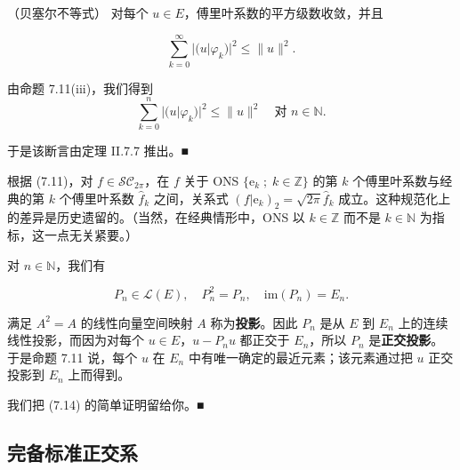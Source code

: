 \begin{corollary}

（贝塞尔不等式）  对每个 $ u \in E $，傅里叶系数的平方级数收敛，并且

\[
\sum_{k=0}^{\infty}|(u|\varphi_{k})|^{2} \le \|u\|^{2} .
\]

\proofhead
由命题 7.11(iii)，我们得到
\[
\sum_{k=0}^{n}|(u|\varphi_{k})|^{2} \le \|u\|^{2} \quad \text{对 } n \in \mathbb{N} .
\]

于是该断言由定理 II.7.7 推出。\nobreak\hspace{0.35em}■

\end{corollary}

\begin{remark}

\begin{items}
\item

根据 (7.11)，对 $ f \in \mathcal{SC}_{2\pi} $，在 $ f $ 关于 ONS $ \{ \mathrm{e}_{k} \;;\; k \in \mathbb{Z} \} $ 的第 $ k $ 个傅里叶系数与经典的第 $ k $ 个傅里叶系数 $ \hat{f}_{k} $ 之间，关系式 $ (f|\mathrm{e}_{k})_{2} = \sqrt{2\pi}\hat{f}_{k} $ 成立。这种规范化上的差异是历史遗留的。（当然，在经典情形中，ONS 以 $ k \in \mathbb{Z} $ 而不是 $ k \in \mathbb{N} $ 为指标，这一点无关紧要。）

\item

对 $ n \in \mathbb{N} $，我们有

\begin{equation}
P_{n} \in \mathcal{L}(E) , \quad P_{n}^{2} = P_{n} , \quad \mathrm{im}(P_{n}) = E_{n} .\tag{7.14}
\end{equation}

满足 $ A^{2} = A $ 的线性向量空间映射 $ A $ 称为\textbf{投影}。因此 $ P_{n} $ 是从 $ E $ 到 $ E_{n} $ 上的连续线性投影，而因为对每个 $ u \in E $，$ u - P_{n}u $ 都正交于 $ E_{n} $，所以 $ P_{n} $ 是\textbf{正交投影}。于是命题 7.11 说，每个 $ u $ 在 $ E_{n} $ 中有唯一确定的最近元素；该元素通过把 $ u $ 正交投影到 $ E_{n} $ 上而得到。

\proofhead
我们把 (7.14) 的简单证明留给你。\nobreak\hspace{0.35em}■
\end{items}

\end{remark}

\subsection*{完备标准正交系}

